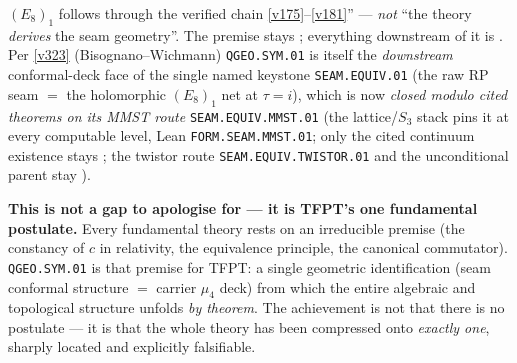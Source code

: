 \documentclass[11pt,a4paper]{article}
\begin{document}
\begin{keybox}
$(E_8)_1$ follows through the verified chain \vref{v175}--\vref{v181}'' --- \emph{not} ``the theory
\emph{derives} the seam geometry''. The premise stays \mO; everything downstream of it is \mE. Per
\vref{v323} (Bisognano--Wichmann) \texttt{QGEO.SYM.01} is itself the \emph{downstream} conformal-deck face
of the single named keystone \texttt{SEAM.EQUIV.01} (the raw RP seam $=$ the holomorphic $(E_8)_1$ net at
$\tau{=}i$), which is now \emph{closed modulo cited theorems on its MMST route} \texttt{SEAM.EQUIV.MMST.01}
(the lattice/$S_3$ stack pins it at every computable
level, Lean \texttt{FORM.SEAM.MMST.01}; only the cited continuum existence stays \mO; the twistor route
\texttt{SEAM.EQUIV.TWISTOR.01} and the unconditional parent stay \mO).
\par\smallskip\noindent\textbf{This is not a gap to apologise for --- it is TFPT's one fundamental
postulate.} Every fundamental theory rests on an irreducible premise (the constancy of $c$ in
relativity, the equivalence principle, the canonical commutator). \texttt{QGEO.SYM.01} is that premise
for TFPT: a single geometric identification (seam conformal structure $=$ carrier $\mu_4$ deck) from
which the entire algebraic and topological structure unfolds \emph{by theorem}. The achievement is not
that there is no postulate --- it is that the whole theory has been compressed onto \emph{exactly one},
sharply located and explicitly falsifiable.
\end{keybox}
\end{document}
